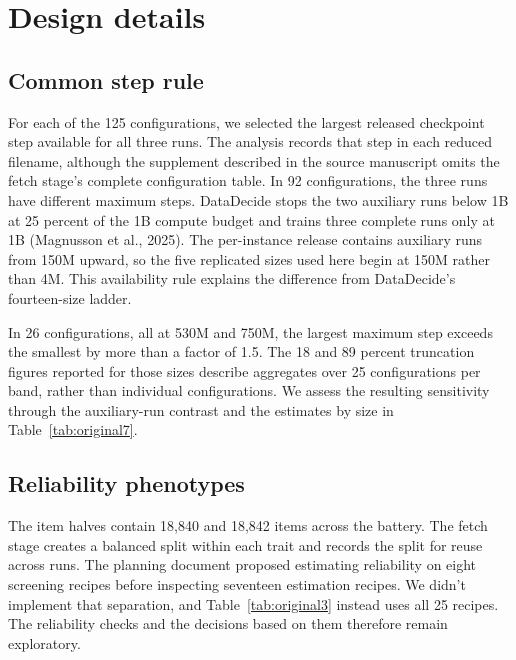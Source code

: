 \section{Design details}
\label{app:design}

\subsection{Common step rule}
For each of the 125 configurations, we selected the largest released checkpoint step available for all three runs. The analysis records that step in each reduced filename, although the supplement described in the source manuscript omits the fetch stage's complete configuration table. In 92 configurations, the three runs have different maximum steps. DataDecide stops the two auxiliary runs below 1B at 25 percent of the 1B compute budget and trains three complete runs only at 1B (Magnusson et al., 2025). The per-instance release contains auxiliary runs from 150M upward, so the five replicated sizes used here begin at 150M rather than 4M. This availability rule explains the difference from DataDecide's fourteen-size ladder.

In 26 configurations, all at 530M and 750M, the largest maximum step exceeds the smallest by more than a factor of 1.5. The 18 and 89 percent truncation figures reported for those sizes describe aggregates over 25 configurations per band, rather than individual configurations. We assess the resulting sensitivity through the auxiliary-run contrast and the estimates by size in Table~\ref{tab:original7}.

\subsection{Reliability phenotypes}
The item halves contain 18,840 and 18,842 items across the battery. The fetch stage creates a balanced split within each trait and records the split for reuse across runs. The planning document proposed estimating reliability on eight screening recipes before inspecting seventeen estimation recipes. We didn't implement that separation, and Table~\ref{tab:original3} instead uses all 25 recipes. The reliability checks and the decisions based on them therefore remain exploratory.


